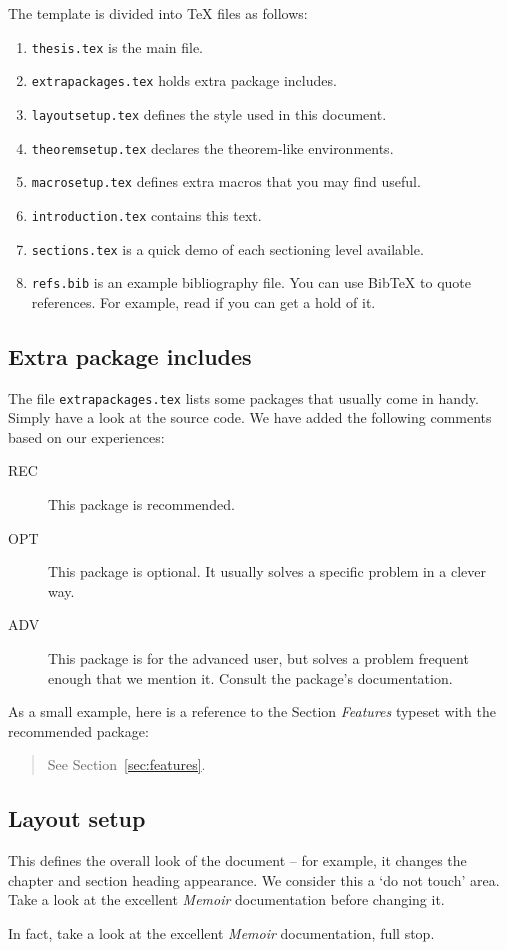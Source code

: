 The template is divided into \TeX{} files as follows:
\begin{enumerate}
\item \texttt{thesis.tex} is the main file.
\item \texttt{extrapackages.tex} holds extra package includes.
\item \texttt{layoutsetup.tex} defines the style used in this document.
\item \texttt{theoremsetup.tex} declares the theorem-like environments.
\item \texttt{macrosetup.tex} defines extra macros that you may find
  useful.
\item \texttt{introduction.tex} contains this text.
\item \texttt{sections.tex} is a quick demo of each sectioning level
  available.
\item \texttt{refs.bib} is an example bibliography file.  You can use
  Bib\TeX{} to quote references.  For example, read
  \cite{bringhurst1996ets} if you can get a hold of it.
\end{enumerate}


\subsection{Extra package includes}

The file \texttt{extrapackages.tex} lists some packages that usually
come in handy.  Simply have a look at the source code.  We have
added the following comments based on our experiences:
\begin{description}
\item[REC] This package is recommended.
\item[OPT] This package is optional.  It usually solves a specific
  problem in a clever way.
\item[ADV] This package is for the advanced user, but solves a problem
  frequent enough that we mention it. Consult the package's
  documentation.
\end{description}

As a small example, here is a reference to the Section \emph{Features}
typeset with the recommended  package:
\begin{quote}
  See Section~\vref{sec:features}.
\end{quote}


\subsection{Layout setup}

This defines the overall look of the document -- for example, it changes the chapter and section heading appearance.  We consider this a `do not touch' area.  Take a look at the excellent \emph{Memoir} documentation before changing it.

In fact, take a look at the excellent \emph{Memoir} documentation, full stop.